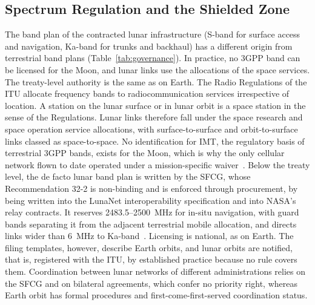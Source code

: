 \documentclass{IEEEoj}
\begin{document}
\subsection{Spectrum Regulation and the Shielded Zone}
\label{sec:spectrum}
The band plan of the contracted lunar infrastructure (S-band for surface access and navigation, Ka-band for trunks and backhaul) has a different origin from terrestrial band plans (Table~\ref{tab:governance}). In practice, no 3GPP band can be licensed for the Moon, and lunar links use the allocations of the space services. The treaty-level authority is the same as on Earth. The Radio Regulations of the ITU allocate frequency bands to radiocommunication services irrespective of location. A station on the lunar surface or in lunar orbit is a space station in the sense of the Regulations. Lunar links therefore fall under the space research and space operation service allocations, with surface-to-surface and orbit-to-surface links classed as space-to-space. No identification for IMT, the regulatory basis of terrestrial 3GPP bands, exists for the Moon, which is why the only cellular network flown to date operated under a mission-specific waiver~\cite{mit_tr_nokia}. Below the treaty level, the de facto lunar band plan is written by the SFCG, whose Recommendation 32-2 is non-binding and is enforced through procurement, by being written into the LunaNet interoperability specification and into NASA's relay contracts. It reserves \SI{2483.5}{}--\SI{2500}{MHz} for in-situ navigation, with guard bands separating it from the adjacent terrestrial mobile allocation, and directs links wider than \SI{6}{MHz} to Ka-band~\cite{sfcg_rec32}. Licensing is national, as on Earth. The filing templates, however, describe Earth orbits, and lunar orbits are notified, that is, registered with the ITU, by established practice because no rule covers them. Coordination between lunar networks of different administrations relies on the SFCG and on bilateral agreements, which confer no priority right, whereas Earth orbit has formal procedures and first-come-first-served coordination status.
\end{document}
